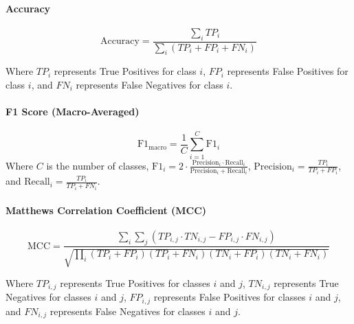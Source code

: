 \documentclass{article}
\theoremstyle{plain}
\theoremstyle{definition}
\theoremstyle{remark}
\begin{document}
\paragraph{Accuracy}
   $$ \text{Accuracy} = \frac{\sum_{i} TP_i}{\sum_{i} (TP_i + FP_i + FN_i)} $$
   
Where \( TP_i \) represents True Positives for class \( i \), \( FP_i \) represents False Positives for class \( i \), and \( FN_i \) represents False Negatives for class \( i \).

\paragraph{F1 Score (Macro-Averaged)}
   $$ \text{F1}_{\text{macro}} = \frac{1}{C} \sum_{i=1}^{C} \text{F1}_i $$
 Where \( C \) is the number of classes, \( \text{F1}_i = 2 \cdot \frac{\text{Precision}_i \cdot \text{Recall}_i}{\text{Precision}_i + \text{Recall}_i} \), \( \text{Precision}_i = \frac{TP_i}{TP_i + FP_i} \), and \( \text{Recall}_i = \frac{TP_i}{TP_i + FN_i} \).

\paragraph{Matthews Correlation Coefficient (MCC)}
   $$ \text{MCC} = \frac{\sum_{i} \sum_{j} (TP_{i,j} \cdot TN_{i,j} - FP_{i,j} \cdot FN_{i,j})}{\sqrt{\prod_{i} (TP_{i} + FP_{i})(TP_{i} + FN_{i})(TN_{i} + FP_{i})(TN_{i} + FN_{i})}} $$

Where \( TP_{i,j} \) represents True Positives for classes \( i \) and \( j \), \( TN_{i,j} \) represents True Negatives for classes \( i \) and \( j \), \( FP_{i,j} \) represents False Positives for classes \( i \) and \( j \), and \( FN_{i,j} \) represents False Negatives for classes \( i \) and \( j \).
\end{document}
